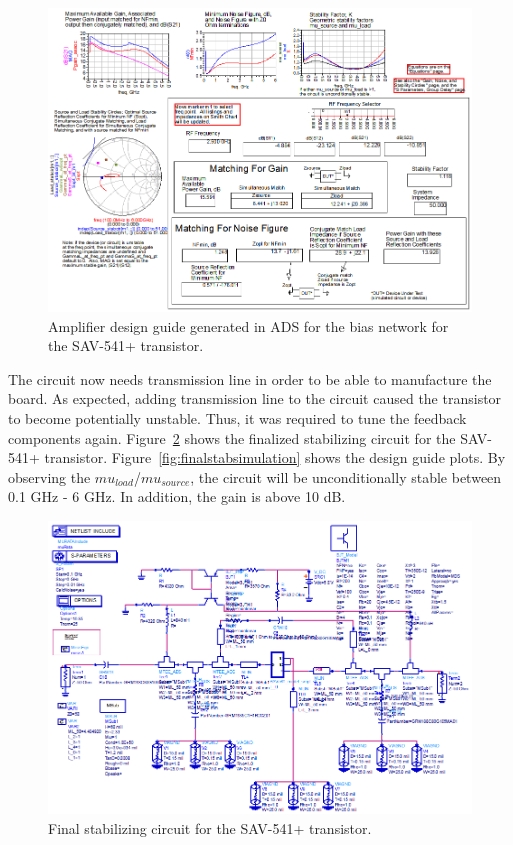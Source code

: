 \documentclass[conference]{IEEEtran}
\begin{document}
\begin{figure}[!h]
\centering
\includegraphics[scale=0.35]{pics/DesignGuideStablizedSimulation.png}
\caption{Amplifier design guide generated in ADS for the bias network for the SAV-541+ transistor.}
\label{fig:designcuidesimulationstabilized}
\end{figure}

The circuit now needs transmission line in order to be able to manufacture the board.  As expected, adding transmission line to the circuit caused the transistor to become potentially unstable.  Thus, it was required to tune the feedback components again.  Figure~\ref{fig:finalstabcircuit} shows the finalized stabilizing circuit for the SAV-541+ transistor.  Figure~\ref{fig:finalstabsimulation} shows the design guide plots.  By observing the $mu_{load}$/$mu_{source}$, the circuit will be unconditionally stable between 0.1 GHz - 6 GHz.  In addition, the gain is above 10 dB.

\begin{figure}[!h]
\centering
\includegraphics[scale=0.35]{pics/FinalStabilizingCircuit.png}
\caption{Final stabilizing circuit for the SAV-541+ transistor.}
\label{fig:finalstabcircuit}
\end{figure}
\end{document}
